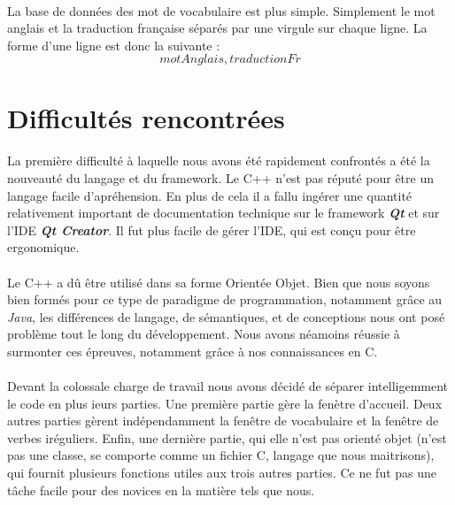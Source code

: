 \documentclass[12pt, a4paper]{report}
\begin{document}
\paragraph{}La base de données des mot de vocabulaire est plus simple. Simplement le mot anglais et la traduction française séparés par une virgule sur chaque ligne. La forme d'une ligne est donc la suivante :
\[motAnglais,traductionFr\]

\newpage
\section*{\hspace{0.6cm}Difficultés rencontrées}

\paragraph{}La première difficulté à laquelle nous avons été rapidement confrontés a été la nouveauté du langage et du framework. Le C++ n'est pas réputé pour être un langage facile d'apréhension. En plus de cela il a fallu ingérer une quantité relativement important de documentation technique sur le framework \textbf{\textit{Qt}} et sur l'IDE \textbf{\textit{Qt Creator}}. Il fut plus facile de gérer l'IDE, qui est conçu pour être ergonomique.

\paragraph{}Le C++ a dû être utilisé dans sa forme Orientée Objet. Bien que nous soyons bien formés pour ce type de paradigme de programmation, notamment grâce au \textit{Java}, les différences de langage, de sémantiques, et de conceptions nous ont posé problème tout le long du développement. Nous avons néamoins réussie à surmonter ces épreuves, notamment grâce à nos connaissances en C.

\paragraph{}Devant la colossale charge de travail nous avons décidé de séparer intelligemment le code en plus ieurs parties. Une première partie gère la fenètre d'accueil. Deux autres parties gèrent indépendamment la fenêtre de vocabulaire et la fenêtre de verbes iréguliers. Enfin, une dernière partie, qui elle n'est pas orienté objet (n'est pas une classe, se comporte comme un fichier C, langage que nous maitrisons), qui fournit plusieurs fonctions utiles aux trois autres parties. Ce ne fut pas une tâche facile pour des novices en la matière tels que nous.
\end{document}
